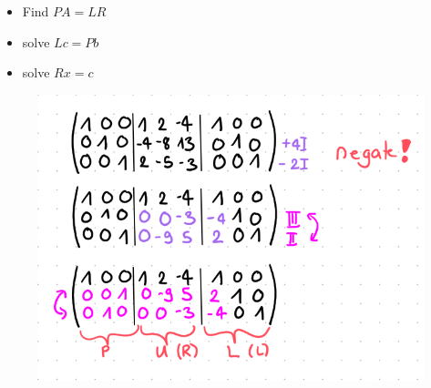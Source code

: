 \documentclass[7pt,landscape, margin = 0.1mm]{article}
\begin{document}
\begin{multicols}{4}
\begin{flushleft}
\begin{itemize}
\item Find $PA=LR$
\item solve $Lc=Pb$
\item solve $Rx=c$
\end{itemize}
\begin{figure}[H]
\centering
\includegraphics[scale=0.5]{pictures/LU-decomposition.png} 
\end{figure}


\end{flushleft}
\end{multicols}
\end{document}
